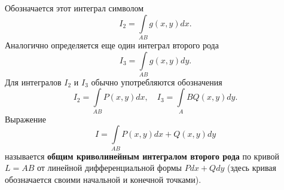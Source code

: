 \documentclass[12pt,titlepage]{report}
\begin{document}
\par Обозначается этот интеграл символом
$$
I_2=\int\limits_{AB} g(x,y)dx.
$$
Аналогично определяется еще один интеграл второго рода
$$
I_3=\int\limits_{AB}g(x,y)dy.
$$
Для интегралов $I_2$ и $I_3$ обычно употребляются обозначения
$$
I_2=\int\limits_{AB} P(x,y)dx,\quad I_3=\int\limits_AB Q(x,y)dy.
$$
Выражение
$$
I=\int\limits_{AB} P(x,y)dx+Q(x,y)dy
$$
называется \textbf{общим криволинейным интегралом второго рода} по кривой $L=AB$ от линейной дифференциальной
формы $Pdx+Qdy$ (здесь кривая обозначается своими начальной и конечной точками).
\end{document}
